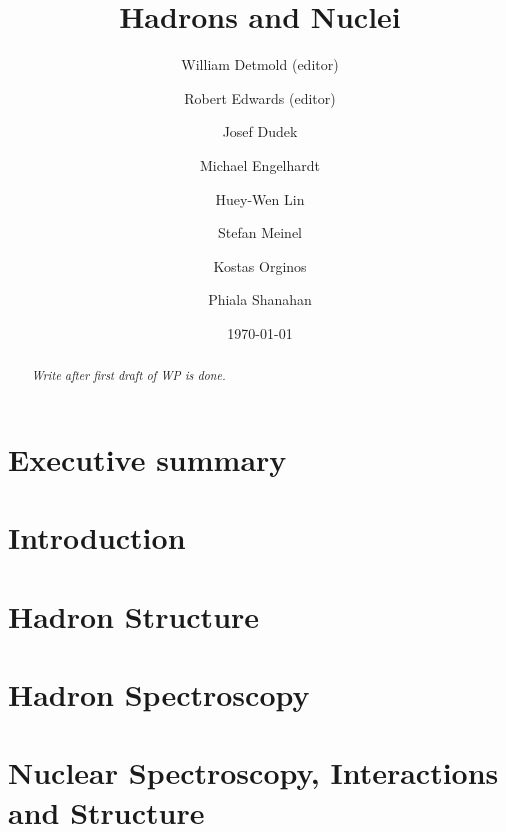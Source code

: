 \documentclass[aps,prd,nofootinbib,floatfix,superscriptaddress,preprint,tightenlines]{revtex4-1}
\begin{document}
\title{Hadrons and Nuclei}
\author{William Detmold (editor)}
\author{Robert Edwards (editor)}
\author{Josef Dudek}
\author{Michael Engelhardt}
\author{Huey-Wen Lin}
\author{Stefan Meinel}
\author{Kostas Orginos}
\author{Phiala Shanahan}




\date{\today}
%
\begin{abstract}
\emph{Write after first draft of WP is done.}
    
\end{abstract}

\maketitle

\section*{Executive summary}


\newpage
\tableofcontents
\newpage 

\section{Introduction}


\section{Hadron Structure}


\section{Hadron Spectroscopy}


\section{Nuclear Spectroscopy, Interactions and Structure}


\begin{figure}
    \vspace*{3cm}
\end{figure}



\end{document}

